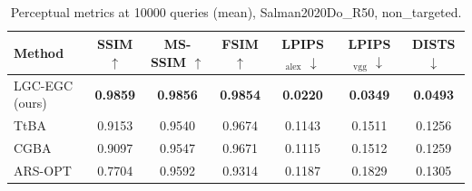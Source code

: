 \begin{table}[t]
\centering\footnotesize
\caption{Perceptual metrics at 10000 queries (mean), Salman2020Do\_R50, non\_targeted.}
\begin{tabular}{lcccccc}
\toprule
Method & SSIM $\uparrow$ & MS-SSIM $\uparrow$ & FSIM $\uparrow$ & LPIPS$_{\mathrm{alex}}$ $\downarrow$ & LPIPS$_{\mathrm{vgg}}$ $\downarrow$ & DISTS $\downarrow$ \\
\midrule
LGC-EGC (ours) & \textbf{0.9859} & \textbf{0.9856} & \textbf{0.9854} & \textbf{0.0220} & \textbf{0.0349} & \textbf{0.0493} \\
TtBA & 0.9153 & 0.9540 & 0.9674 & 0.1143 & 0.1511 & 0.1256 \\
CGBA & 0.9097 & 0.9547 & 0.9671 & 0.1115 & 0.1512 & 0.1259 \\
ARS-OPT & 0.7704 & 0.9592 & 0.9314 & 0.1187 & 0.1829 & 0.1305 \\
\bottomrule
\end{tabular}
\end{table}
